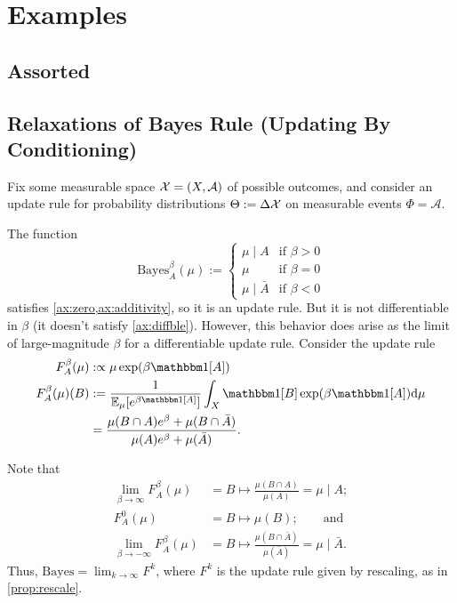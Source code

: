 \documentclass{article}
\begin{document}
%

\section{Examples}
\subsection{Assorted}


\subsection{Relaxations of Bayes Rule (Updating By Conditioning)}
Fix some measurable space $\mathcal X = (X, \mathcal A)$ of possible outcomes, and consider an update rule for probability distributions $\Theta := \Delta\mathcal X$
on measurable events $\Phi = \mathcal A$.

The function
\[
    \mathrm{Bayes}^\beta_A(\mu) := \begin{cases}
            \mu \mid A &  \text{if }\beta > 0 \\
            \mu & \text{if } \beta = 0 \\
            \mu \mid \bar A &  \text{if } \beta < 0
        \end{cases}
\]
satisfies \cref{ax:zero,ax:additivity}, so it is an update rule.  But it is not differentiable in $\beta$ (it doesn't satisfy \cref{ax:diffble}).
However, this behavior does arise as the limit of large-magnitude $\beta$ for a differentiable update rule. Consider the update rule
\begin{align*}
    F^\beta_A (\mu) &:\propto \mu \exp(\beta \mathbbm1[A]) \\
    F^\beta_A (\mu)(B) &:=
        \frac{1}{\Ex_{\mu}[e^{\beta\mathbbm1[A]}]}\int_{X}  \mathbbm1[B] \exp(\beta \mathbbm1[A]) \mathrm d\mu \\
        &=
        \frac{\mu(B\cap A)e^{\beta} + \mu(B \cap \bar A) }
        {\mu(A)e^{\beta} + \mu(\bar A)}.
\end{align*}

Note that
\begin{align*}
\lim_{\beta\to\infty} F^\beta_A(\mu) &= B \mapsto \frac{\mu(B \cap A)}{\mu(A)}
   = \mu \mid A; \\
 F^0_A(\mu) &= B \mapsto \mu(B); \qquad\text{and}\\
\lim_{\beta\to-\infty} F^\beta_A(\mu) &= B \mapsto \frac{\mu(B \cap \bar A)}{\mu(\bar A)}
      = \mu \mid \bar A.
\end{align*}
Thus, $\mathrm{Bayes} = \lim_{k \to \infty} F^{k}$, where $F^k$ is the update rule given by rescaling, as in \cref{prop:rescale}.
\end{document}
